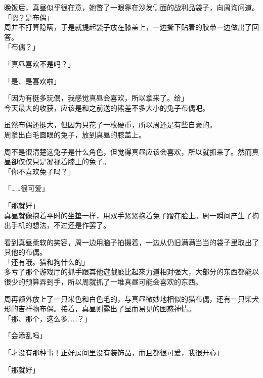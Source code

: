 晚饭后，真昼似乎很在意，她瞥了一眼靠在沙发侧面的战利品袋子，向周询问道。\\

「嗯？是布偶」\\

周并不打算隐瞒，于是就提起袋子放在膝盖上，一边撕下贴着的胶带一边做出了回答。\\

「布偶？」

「真昼喜欢不是吗？」

「是、是喜欢啦」

「因为有挺多玩偶，我感觉真昼会喜欢，所以拿来了。给」\\

今天最大的收获，应该是和之前送的熊差不多大小的兔子布偶吧。

虽然布偶还挺大，但因为只花了一枚硬币，所以周还是有些自豪的。\\

周拿出白毛圆眼的兔子，放到真昼的膝盖上。

周不是很清楚这兔子是什么角色，但觉得真昼应该会喜欢，所以就抓来了。然而真昼卻仅仅只是凝视着膝上的兔子。\\

「你不喜欢兔子吗？」

「……很可爱」

「那就好」\\

真昼就像抱着平时的坐垫一样，用双手紧紧抱着兔子蹭在脸上。周一瞬间产生了掏出手机的想法，不过还是作罢了。

看到真昼柔软的笑容，周一边用脑子拍摄着，一边从仍旧满满当当的袋子里取出了其他的布偶。\\%

「还有哦。猫和狗什么的」\\

多亏了那个游戏厅的抓手跟其他遊戲廳比起來力道相对强大，大部分的东西都能以很少的预算弄到手，所以周就抓了一堆真昼可能会喜欢的东西。

周再额外放上了一只米色和白色毛的，与真昼微妙地相似的猫布偶，还有一只柴犬形的吉祥物布偶。接着，真昼则露出了显而易见的困惑神情。\\

「那、那个，这么多……？」

「会添乱吗」%

「才没有那种事！正好房间里没有装饰品，而且都很可爱，我很开心」

「那就好」\\

